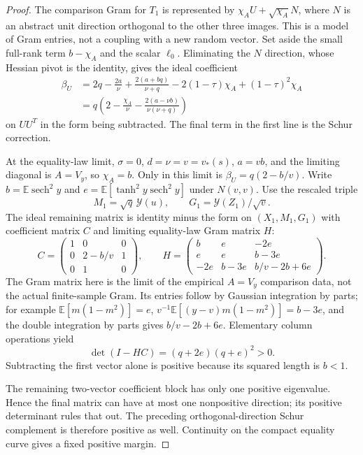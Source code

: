 \begin{proof}
The comparison Gram for \(T_1\) is represented by
\(\chi_AU+\sqrt{\chi_A}N\), where \(N\) is an abstract unit
direction orthogonal to the other three images. This is a model
of Gram entries, not a coupling with a new random vector.
Set aside the small full-rank term \(b-\chi_A\) and the scalar
\(\ell_0\). Eliminating the \(N\) direction, whose Hessian pivot
is the identity, gives the ideal coefficient
\[
\begin{split}
 \beta_U
 &=2q-\frac{2a}{\nu}+\frac{2(a+bq)}{\nu+q}
       -2(1-\tau)\chi_A+(1-\tau)^2\chi_A\\
 &=q\left(2-\frac{\chi_A}{\nu}
       -\frac{2(a-\nu b)}{\nu(\nu+q)}\right)
\end{split}
\]
on \(UU^T\) in the form being subtracted. The final term in
the first line is the Schur correction.

At the equality-law limit, \(\sigma=0\), \(d=\nu=v=v_*(s)\),
\(a=vb\), and the limiting diagonal is \(A=V_y\), so
\(\chi_A=b\). Only in this limit is \(\beta_U=q(2-b/v)\).
Write
$b=\mathbb E\operatorname{sech}^2y$ and
$e=\mathbb E[\tanh^2 y\operatorname{sech}^2y]$ under $N(v,v)$.
Use the rescaled triple
\[
 M_1=\sqrt q\,\mathcal Y(u),\qquad
 G_1=\mathcal Y(Z_1)/\sqrt v.
\]
The ideal remaining matrix is identity minus the form on
$(X_1,M_1,G_1)$ with coefficient matrix \(C\) and limiting
equality-law Gram matrix \(H\):
\[
 C=\begin{pmatrix}1&0&0\\0&2-b/v&1\\0&1&0\end{pmatrix},\qquad
 H=\begin{pmatrix}
 b&e&-2e\\e&e&b-3e\\-2e&b-3e&b/v-2b+6e
 \end{pmatrix}.
\]
The Gram matrix here is the limit of the empirical \(A=V_y\)
comparison data, not the actual finite-sample Gram. Its entries
follow by Gaussian integration by parts; for example $\mathbb E[m(1-m^2)]=e$,
$v^{-1}\mathbb E[(y-v)m(1-m^2)]=b-3e$, and the double integration by
parts gives $b/v-2b+6e$.  Elementary column operations yield
\[
 \det(I-HC)=(q+2e)(q+e)^2>0.
\]
Subtracting the first vector alone is positive because its squared
length is $b<1$.

The remaining two-vector coefficient block has only
one positive eigenvalue.  Hence the final matrix can have at most one
nonpositive direction; its positive determinant rules that out.
The preceding orthogonal-direction Schur complement is therefore
positive as well.  Continuity on the compact equality curve gives a
fixed positive margin.


\end{proof}

